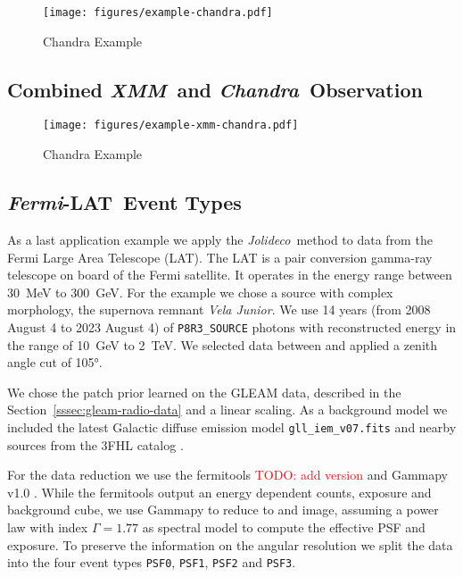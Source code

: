 \documentclass[twocolumn]{aastex631}
\newcommand{\chandra}{\textit{Chandra}~}
\newcommand{\xmm}{\textit{XMM}~}
\newcommand{\fermi}{\textit{Fermi}-LAT~}
\newcommand{\jolideco}{\textit{Jolideco}~}
\newcommand{\todo}[1]{\textcolor{red}{TODO: #1}\PackageWarning{TODO:}{#1!}}
\begin{document}
    \begin{figure*}
        \begin{centering}
            \texttt{[image: figures/example-chandra.pdf]}
            \caption{
                Chandra Example
            }
            \label{fig:example-chandra}
        \end{centering}
    \end{figure*}


    \subsection{Combined \xmm and \chandra Observation}
    \begin{figure*}
        \begin{centering}
            \texttt{[image: figures/example-xmm-chandra.pdf]}
            \caption{
                Chandra Example
            }
            \label{fig:example-xmm-chandra}
        \end{centering}
    \end{figure*}


    \subsection{\fermi Event Types}
    As a last application example we apply the \jolideco method to data from the Fermi Large Area Telescope (LAT).
    The LAT is a pair conversion gamma-ray telescope on board of the Fermi satellite. It operates in the energy range between \qty[mode = text]{30}{MeV} to  \qty[mode = text]{300}{GeV}.
    For the example we chose a source with complex morphology, the supernova remnant \textit{Vela Junior}.
    We use 14 years (from 2008 August 4 to 2023 August 4) of \texttt{P8R3\_SOURCE} photons with reconstructed energy in the range of \qty[mode = text]{10}{GeV} to  \qty[mode = text]{2}{TeV}.
    We selected data between  and applied a zenith angle cut of \ang{105}.

    We chose the patch prior learned on the GLEAM data, described in the Section~\ref{sssec:gleam-radio-data}
    and a linear scaling. 
    As a background model we included the latest Galactic diffuse emission model \texttt{gll\_iem\_v07.fits} and nearby sources from the 3FHL catalog \cite{Ajello2017}.

    For the data reduction we use the fermitools \todo{add version} and Gammapy v1.0 \cite{Gammapyv1.0}.
    While the fermitools output an energy dependent counts, exposure and background cube, we use Gammapy
    to reduce to and image, assuming a power law with index $\Gamma=1.77$ \citep{Ajello2017} as spectral model to compute the effective PSF and exposure. To preserve the information on the angular resolution we split the data into the four event types \texttt{PSF0}, \texttt{PSF1}, \texttt{PSF2} and \texttt{PSF3}.
    
\end{document}
